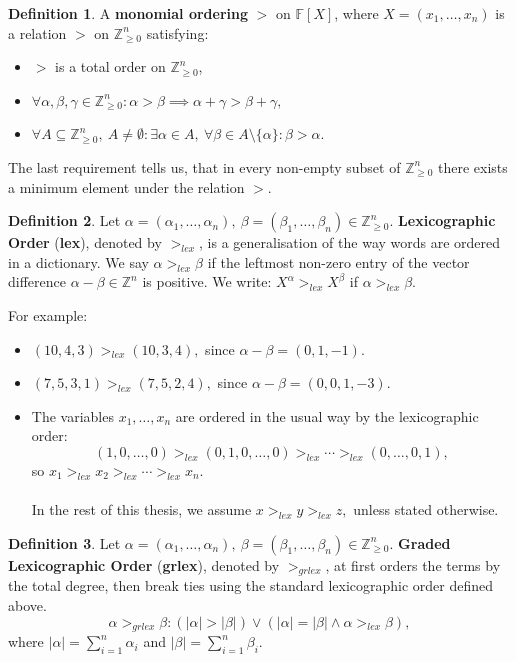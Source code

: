 \documentclass[thesis=M,english]{FITthesis}[2012/10/20]
\theoremstyle{remark}
\theoremstyle{definition}
\newtheorem{DF}{Definition}[section]
\begin{document}
\begin{DF}
A \textbf{monomial ordering} $>$ on $\mathbb{F}[X]$, where $X = (x_1, \ldots, x_n)$ is a relation $>$ on $\mathbb{Z}_{\geq 0}^n$ satisfying:
\begin{itemize}
\item $>$ is a total order on $\mathbb{Z}_{\geq 0}^n$,
\item $\forall \alpha, \beta, \gamma \in \mathbb{Z}_{\geq 0}^n: \alpha > \beta \implies \alpha + \gamma > \beta + \gamma,$
\item $\forall A \subseteq \mathbb{Z}_{\geq 0}^n,\ A \neq \emptyset: \exists \alpha \in A,\ \forall \beta \in A \setminus \{\alpha \}: \beta > \alpha.$ 
\end{itemize}
\noindent The last requirement tells us, that in every non-empty subset of $\mathbb{Z}_{\geq 0}^n$ there exists a minimum element under the relation $>$.
\end{DF}
\begin{DF}
Let $\alpha = (\alpha_1, \ldots, \alpha_n),\ \beta = (\beta_1, \ldots, \beta_n)\in \mathbb{Z}_{\geq 0}^n.$ \textbf{Lexicographic Order} (\textbf{lex}), denoted by $>_{lex}$, is a generalisation of the way words are ordered in a dictionary. We say $\alpha >_{lex} \beta$ if the leftmost non-zero entry of the vector difference $\alpha - \beta \in \mathbb{Z}^n$ is positive. We write: $X^\alpha >_{lex} X^\beta$ if $\alpha >_{lex} \beta$.
\end{DF}
For example:
\begin{itemize}
\item $(10,4,3) >_{lex} (10, 3, 4),$ since $\alpha - \beta = (0,1,-1)$.
\item $(7,5,3,1) >_{lex} (7, 5, 2, 4),$ since $\alpha - \beta = (0,0,1,-3)$.
\item The variables $x_1,\ldots,x_n$ are ordered in the usual way by the lexicographic order:
$$
(1,0,\ldots,0) >_{lex} (0,1,0,\ldots, 0) >_{lex} \cdots >_{lex} (0, \ldots, 0, 1),
$$
so $x_1 >_{lex} x_2 >_{lex} \cdots >_{lex} x_n.$ \\ \\
In the rest of this thesis, we assume $x >_{lex} y >_{lex} z,$ unless stated otherwise.
\end{itemize} 
\begin{DF}
Let $\alpha = (\alpha_1, \ldots, \alpha_n),\ \beta = (\beta_1, \ldots, \beta_n)\in \mathbb{Z}_{\geq 0}^n.$ \textbf{Graded Lexicographic Order} (\textbf{grlex}), denoted by $>_{grlex}$, at first orders the terms by the total degree, then break ties using the standard lexicographic order defined above. 
$$
\alpha >_{grlex} \beta: (|\alpha| > |\beta|) \lor (|\alpha| = |\beta| \land \alpha >_{lex} \beta),
$$
where $|\alpha| = \sum_{i=1}^n \alpha_i$ and $|\beta| = \sum_{i=1}^n \beta_i$.
\end{DF}
\end{document}
